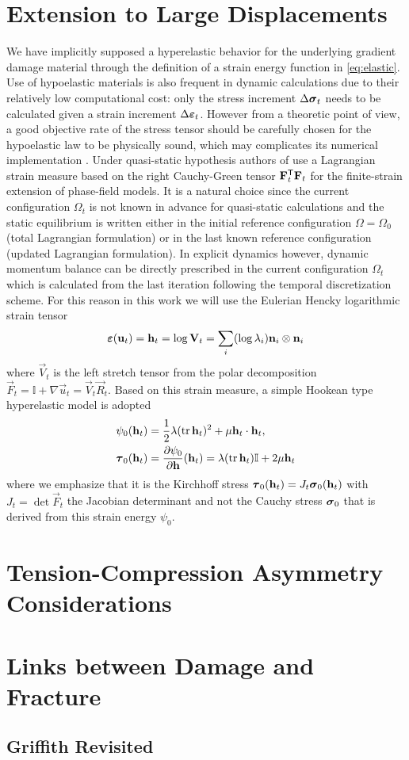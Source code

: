 \section{Extension to Large Displacements}
We have implicitly supposed a hyperelastic behavior for the underlying gradient damage material through the definition of a strain energy function in \eqref{eq:elastic}. Use of hypoelastic materials is also frequent in dynamic calculations due to their relatively low computational cost: only the stress increment $\Delta\sig_t$ needs to be calculated given a strain increment $\Delta\eps_t$. However from a theoretic point of view, a good objective rate of the stress tensor should be carefully chosen for the hypoelastic law to be physically sound, which may complicates its numerical implementation \cite{SimoPister:1984}. Under quasi-static hypothesis authors of \cite{PieroLancioniMarch:2007,MieheSchaenzelUlmer:2015} use a Lagrangian strain measure based on the right Cauchy-Green tensor $\vec{F}_t^\mT\vec{F}_t$ for the finite-strain extension of phase-field models. It is a natural choice since the current configuration $\Omega_t$ is not known in advance for quasi-static calculations and the static equilibrium is written either in the initial reference configuration $\Omega=\Omega_0$ (total Lagrangian formulation) or in the last known reference configuration (updated Lagrangian formulation). In explicit dynamics however, dynamic momentum balance can be directly prescribed in the current configuration $\Omega_t$ which is calculated from the last iteration following the temporal discretization scheme. For this reason in this work we will use the Eulerian Hencky logarithmic strain tensor \cite{XiaoBruhnsMeyers:1997}
\begin{equation} \label{eq:logstrain}
\eps(\vec{u}_t)=\vec{h}_t=\log\vec{V}_t=\sum_i(\log\lambda_i)\vec{n}_i\otimes\vec{n}_i
\end{equation}
where $\vec{V}_t$ is the left stretch tensor from the polar decomposition $\vec{F}_t=\mathbb{I}+\nabla\vec{u}_t=\vec{V}_t\vec{R}_t$. Based on this strain measure, a simple Hookean type hyperelastic model \cite{XiaoChen:2002} is adopted
\begin{align}
\psi_0(\vec{h}_t) &= \frac{1}{2}\lambda(\tr\vec{h}_t)^2+\mu\vec{h}_t\cdot\vec{h}_t, \label{eq:soundpsi} \\
\vtau_0(\vec{h}_t) &= \frac{\partial\psi_0}{\partial\vec{h}}(\vec{h}_t)=\lambda(\tr\vec{h}_t)\mathbb{I}+2\mu\vec{h}_t \label{eq:henckystress}
\end{align}
where we emphasize that it is the Kirchhoff stress $\vtau_0(\vec{h}_t)=J_t\sig_0(\vec{h}_t)$ with $J_t=\det\vec{F}_t$ the Jacobian determinant and not the Cauchy stress $\sig_0$ that is derived from this strain energy $\psi_0$.

\section{Tension-Compression Asymmetry Considerations}

\section{Links between Damage and Fracture}

\subsection{Griffith Revisited}
